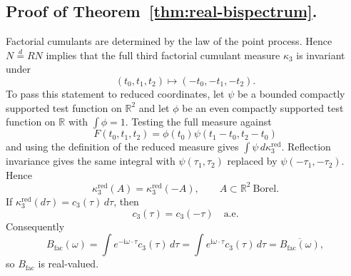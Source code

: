 \documentclass[aap,press]{apt} \volno{00} \partno{00}
\newcommand{\R}{\mathbb{R}}
\renewcommand{\ii}{\mathrm{i}}
\newcommand{\1}{\mathbf{1}}
\numberwithin{equation}{section}
\begin{document}
\subsection{Proof of Theorem~\ref{thm:real-bispectrum}.}
Factorial cumulants are determined by the law of the point process. Hence $N\stackrel d=RN$ implies that the full third factorial cumulant measure $\kappa_3$ is invariant under
\[
(t_0,t_1,t_2)\mapsto(-t_0,-t_1,-t_2).
\]
To pass this statement to reduced coordinates, let $\psi$ be a bounded compactly supported test function on $\R^2$ and let $\phi$ be an even compactly supported test function on $\R$ with $\int\phi=1$. Testing the full measure against
\[
F(t_0,t_1,t_2)=\phi(t_0)\psi(t_1-t_0,t_2-t_0)
\]
and using the definition of the reduced measure gives $\int\psi\,d\kappa_3^{\mathrm{red}}$. Reflection invariance gives the same integral with $\psi(\tau_1,\tau_2)$ replaced by $\psi(-\tau_1,-\tau_2)$. Hence
\[
\kappa_3^{\mathrm{red}}(A)=\kappa_3^{\mathrm{red}}(-A),
\qquad A\subset\R^2\ \text{Borel}.
\]
If $\kappa_3^{\mathrm{red}}(d\tau)=c_3(\tau)\,d\tau$, then
\[
c_3(\tau)=c_3(-\tau)\quad\text{a.e.}
\]
Consequently
\[
B_{\mathrm{fac}}(\omega)
=
\int e^{-\ii\omega\cdot\tau}c_3(\tau)\,d\tau
=
\int e^{\ii\omega\cdot\tau}c_3(\tau)\,d\tau
=
\overline{B_{\mathrm{fac}}(\omega)},
\]
so $B_{\mathrm{fac}}$ is real-valued.
\end{document}
